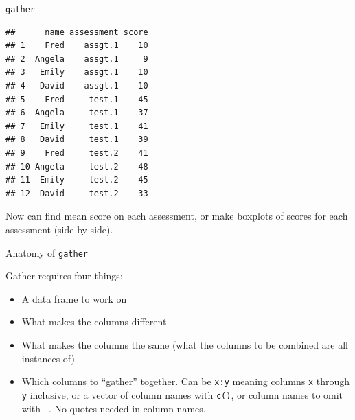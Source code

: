 \begin{frame}[fragile]{\texttt{gather}}
  
  {\small
\begin{knitrout}
\color{fgcolor}\begin{kframe}
\begin{alltt}
\hlkwb{=}\hlopt{:}
\end{alltt}
\begin{verbatim}
##      name assessment score
## 1    Fred    assgt.1    10
## 2  Angela    assgt.1     9
## 3   Emily    assgt.1    10
## 4   David    assgt.1    10
## 5    Fred     test.1    45
## 6  Angela     test.1    37
## 7   Emily     test.1    41
## 8   David     test.1    39
## 9    Fred     test.2    41
## 10 Angela     test.2    48
## 11  Emily     test.2    45
## 12  David     test.2    33
\end{verbatim}
\end{kframe}
\end{knitrout}
}

Now can find mean score on each assessment, or make boxplots of scores
for each assessment (side by side). 
\end{frame}

\begin{frame}[fragile]{Anatomy of \texttt{gather}}
  
  Gather requires four things:
  \begin{itemize}
  \item A data frame to work on
  \item What makes the columns different
  \item What makes the columns the same (what the columns to be combined
    are all instances of)
  \item Which columns to ``gather'' together. Can be \texttt{x:y}
    meaning columns \texttt{x} through \texttt{y} inclusive, or a
    vector of column names with \texttt{c()}, or column names to omit
    with \texttt{-}. No quotes needed in column names.
  \end{itemize}
  
\end{frame}


